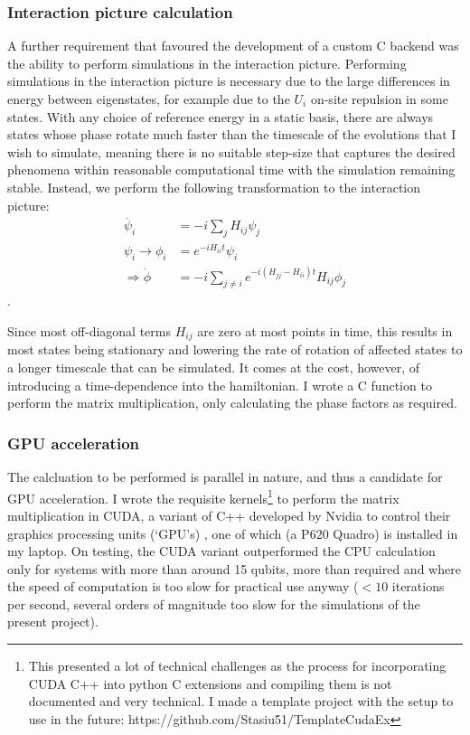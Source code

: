 \documentclass{report}
\begin{document}
\subsubsection{Interaction picture calculation}
A further requirement that favoured the development of a custom C backend was the ability to perform simulations in the interaction picture. Performing simulations in the interaction picture is necessary due to the large differences in energy between eigenstates, for example due to the $U_i$ on-site repulsion in some states. With any choice of reference energy in a static basis, there are always states whose phase rotate much faster than the timescale of the evolutions that I wish to simulate, meaning there is no suitable step-size that captures the desired phenomena within reasonable computational time with the simulation remaining stable. Instead, we perform the following transformation to the interaction picture:
\begin{align*}
    \dot{\psi_i} &= -i\sum_j{H_{ij}\psi_j}\\
     \psi_i \rightarrow \phi_i &= e^{-i H_{ii} t} \psi_i \\
    \Rightarrow \dot{\phi} &= -i\sum_{j\ne i}{e^{- i (H_{jj} - H_{ii})t} H_{ij}\phi_j}
\end{align*}.

Since most off-diagonal terms $H_{ij}$ are zero at most points in time, this results in most states being stationary and lowering the rate of rotation of affected states to a longer timescale that can be simulated. It comes at the cost, however, of introducing a time-dependence into the hamiltonian. I wrote a C function to perform the matrix multiplication, only calculating the phase factors as required.

\subsubsection{GPU acceleration}
The calcluation to be performed is parallel in nature, and thus a candidate for GPU acceleration. I wrote the requisite kernels\footnote{This presented a lot of technical challenges as the process for incorporating CUDA C++ into python C extensions and compiling them is not documented and very technical. I made a template project with the setup to use in the future: https://github.com/Stasiu51/TemplateCudaEx} to perform the matrix multiplication in CUDA, a variant of C++ developed by Nvidia to control their graphics processing units (`GPU's) \cite{cuda}, one of which (a P620 Quadro) is installed in my laptop. On testing, the CUDA variant outperformed the CPU calculation only for systems with more than around 15 qubits, more than required and where the speed of computation is too slow for practical use anyway ($<10$ iterations per second, several orders of magnitude too slow for the simulations of the present project).
\end{document}
